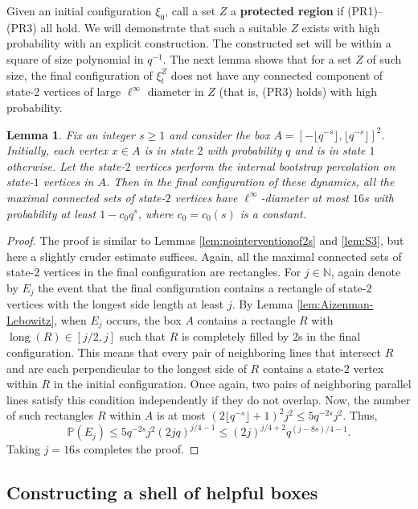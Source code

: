 \documentclass{article}
\renewcommand{\P}{\mathbb{P}}
\newcommand{\N}{\mathbb{N}}
\numberwithin{equation}{section}
\newtheorem{lemma}[theorem]{Lemma}
\begin{document}
Given an initial configuration $\xi_0$, call a set $Z$ a {\bf protected region} if (PR1)--(PR3) all hold.
We will demonstrate that such a suitable $Z$ exists with high probability with an explicit construction.
The constructed set will be within a square of size polynomial in $q^{-1}$.
The next lemma shows that for a set $Z$ of such size, the final configuration of $\xi_t^Z$ does not have any connected component of state-2 vertices of large $\ell^\infty$ diameter in $Z$ (that is, (PR3) holds) with high probability.

\begin{lemma}
    \label{lem:PR3}
    Fix an integer $s \geq 1$ and consider the box $A = [-\lfloor q^{-s} \rfloor, \lfloor q^{-s} \rfloor]^2$.
    Initially, each vertex $x \in A$ is in state $2$ with probability $q$ and is in state $1$ otherwise.
    Let the state-$2$ vertices perform the internal bootstrap percolation on state-$1$ vertices in $A$.
    Then in the final configuration of these dynamics, all the maximal connected sets of state-$2$ vertices have $\ell^\infty$-diameter at most $16s$ with probability at least $1 - c_0q^s$, where $c_0 = c_0(s)$ is a constant.
\end{lemma}
\begin{proof}
    The proof is similar to Lemmas \ref{lem:nointerventionof2s} and \ref{lem:S3}, but here a slightly cruder estimate suffices.
    Again, all the maximal connected sets of state-$2$ vertices in the final configuration are rectangles. 
    For $j \in \N$, again denote by $E_j$ the event that the final configuration contains a rectangle of state-$2$ vertices with the longest side length at least $j$.
    By Lemma \ref{lem:Aizenman-Lebowitz}, when $E_j$ occurs, the box $A$ contains a rectangle $R$ with $\operatorname{long}(R) \in [j/2, j]$ such that $R$ is completely filled by $2$s in the final configuration.
    This means that every pair of neighboring lines that intersect $R$ and are each perpendicular to the longest side of $R$ contains a state-$2$ vertex within $R$ in the initial configuration.
    Once again, two pairs of neighboring parallel lines satisfy this condition independently if they do not overlap.
    Now, the number of such rectangles $R$ within $A$ is at most $(2\lfloor q^{-s} \rfloor + 1)^2 j^2 \leq 5q^{-2s}j^2$.
    Thus,
    \[
    \P(E_j) \leq 5q^{-2s} j^2 (2jq)^{j/4 - 1} 
    \leq
    (2j)^{j/4 + 2} q^{(j - 8s)/4 - 1}.
    \]
    Taking $j = 16s$ completes the proof.
\end{proof}

\subsection{Constructing a shell of helpful boxes}
\end{document}
